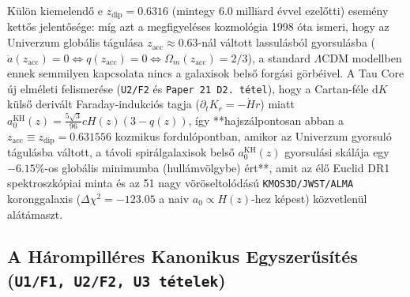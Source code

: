 \documentclass[11pt,a4paper]{article}
\begin{document}
Külön kiemelendő e $z_{\mathrm{dip}} = 0.6316$ (mintegy $6.0\;\mathrm{milli\acute{a}rd}$ évvel ezelőtti) esemény kettős jelentősége: míg azt a megfigyeléses kozmológia 1998 óta ismeri, hogy az Univerzum globális tágulása $z_{\mathrm{acc}} \approx 0.63$-nál váltott lassulásból gyorsulásba ($\ddot{a}(z_{\mathrm{acc}}) = 0 \iff q(z_{\mathrm{acc}}) = 0 \iff \Omega_m(z_{\mathrm{acc}}) = 2/3$), a standard $\Lambda\mathrm{CDM}$ modellben ennek semmilyen kapcsolata nincs a galaxisok belső forgási görbéivel. A Tau Core új elméleti felismerése (\texttt{U2/F2} és \texttt{Paper 21 D2.\ tétel}), hogy a Cartan-féle $\mathrm{d}K$ külső derivált Faraday-indukciós tagja ($\partial_t K_r = -\dot{H}r$) miatt $a_0^{\mathrm{KH}}(z) = \frac{5\sqrt{3}}{96}cH(z)(3 - q(z))$, így **hajszálpontosan abban a $z_{\mathrm{acc}} \equiv z_{\mathrm{dip}} = 0.631556$ kozmikus fordulópontban, amikor az Univerzum gyorsuló tágulásba váltott, a távoli spirálgalaxisok belső $a_0^{\mathrm{KH}}(z)$ gyorsulási skálája egy $-6.15\%$-os globális minimumba (hullámvölgybe) ért**, amit az élő Euclid DR1 spektroszkópiai minta és az 51 nagy vöröseltolódású \texttt{KMOS3D/JWST/ALMA} koronggalaxis ($\Delta\chi^2 = -123.05$ a naiv $a_0\propto H(z)$-hez képest) közvetlenül alátámaszt.

\subsection{A Hárompilléres Kanonikus Egyszerűsítés (\texorpdfstring{\texttt{U1/F1, U2/F2, U3 tételek}}{U1/F1, U2/F2, U3 tetelek})}
\end{document}
